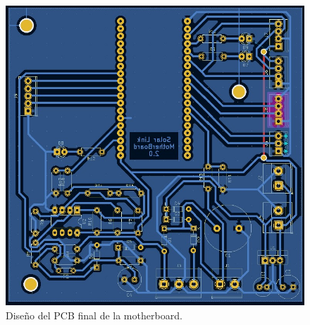 \begin{figure}[H]
    \centering
    \includegraphics[width=0.7\linewidth]{hardware/Screenshot_17.jpg}
    \caption{Diseño del PCB final de la motherboard.}
    \label{fig:mother-pcb}
\end{figure}

